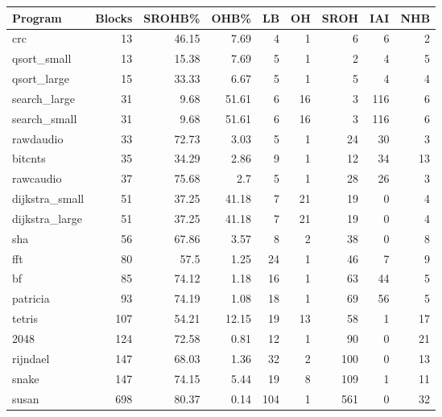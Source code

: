 \begin{tabular}{lrrrrrrrr}
\hline
 Program        &   Blocks &   SROHB\% &   OHB\% &   LB &   OH &   SROH &   IAI &   NHB \\
\hline
 crc            &       13 &    46.15 &   7.69 &    4 &    1 &      6 &     6 &     2 \\
 qsort\_small    &       13 &    15.38 &   7.69 &    5 &    1 &      2 &     4 &     5 \\
 qsort\_large    &       15 &    33.33 &   6.67 &    5 &    1 &      5 &     4 &     4 \\
 search\_large   &       31 &     9.68 &  51.61 &    6 &   16 &      3 &   116 &     6 \\
 search\_small   &       31 &     9.68 &  51.61 &    6 &   16 &      3 &   116 &     6 \\
 rawdaudio      &       33 &    72.73 &   3.03 &    5 &    1 &     24 &    30 &     3 \\
 bitcnts        &       35 &    34.29 &   2.86 &    9 &    1 &     12 &    34 &    13 \\
 rawcaudio      &       37 &    75.68 &   2.7  &    5 &    1 &     28 &    26 &     3 \\
 dijkstra\_small &       51 &    37.25 &  41.18 &    7 &   21 &     19 &     0 &     4 \\
 dijkstra\_large &       51 &    37.25 &  41.18 &    7 &   21 &     19 &     0 &     4 \\
 sha            &       56 &    67.86 &   3.57 &    8 &    2 &     38 &     0 &     8 \\
 fft            &       80 &    57.5  &   1.25 &   24 &    1 &     46 &     7 &     9 \\
 bf             &       85 &    74.12 &   1.18 &   16 &    1 &     63 &    44 &     5 \\
 patricia       &       93 &    74.19 &   1.08 &   18 &    1 &     69 &    56 &     5 \\
 tetris         &      107 &    54.21 &  12.15 &   19 &   13 &     58 &     1 &    17 \\
 2048           &      124 &    72.58 &   0.81 &   12 &    1 &     90 &     0 &    21 \\
 rijndael       &      147 &    68.03 &   1.36 &   32 &    2 &    100 &     0 &    13 \\
 snake          &      147 &    74.15 &   5.44 &   19 &    8 &    109 &     1 &    11 \\
 susan          &      698 &    80.37 &   0.14 &  104 &    1 &    561 &     0 &    32 \\

\end{tabular}
